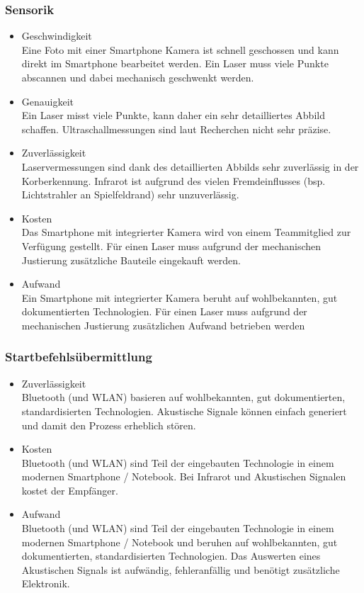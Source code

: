 		\subsubsection{Sensorik}
			\begin{itemize}
				\item Geschwindigkeit\\
				Eine Foto mit einer Smartphone Kamera ist schnell geschossen und kann direkt im Smartphone bearbeitet werden. Ein Laser muss viele Punkte abscannen und dabei mechanisch geschwenkt werden.
				\item Genauigkeit\\
				Ein Laser misst viele Punkte, kann daher ein sehr detailliertes Abbild schaffen. Ultraschallmessungen sind laut Recherchen nicht sehr präzise.  
				\item Zuverlässigkeit\\
				Laservermessungen sind dank des detaillierten Abbilds sehr zuverlässig in der Korberkennung. Infrarot ist aufgrund des vielen Fremdeinflusses (bsp. Lichtstrahler an Spielfeldrand) sehr unzuverlässig.
				\item Kosten\\
				Das Smartphone mit integrierter Kamera wird von einem Teammitglied zur Verfügung gestellt. Für einen Laser muss aufgrund der mechanischen Justierung zusätzliche Bauteile eingekauft werden.
				\item Aufwand\\
				Ein Smartphone mit integrierter Kamera beruht auf wohlbekannten, gut dokumentierten Technologien. Für einen Laser muss aufgrund der mechanischen Justierung zusätzlichen Aufwand betrieben werden
			\end{itemize}
			
		\subsubsection{Startbefehlsübermittlung}
			\begin{itemize}
				\item Zuverlässigkeit\\
				Bluetooth (und WLAN) basieren auf wohlbekannten, gut dokumentierten, standardisierten Technologien. Akustische Signale können einfach generiert und damit den Prozess erheblich stören.
				\item Kosten\\
				Bluetooth (und WLAN) sind Teil der eingebauten Technologie in einem modernen Smartphone / Notebook. Bei Infrarot und Akustischen Signalen kostet der Empfänger.
				\item Aufwand\\
				Bluetooth (und WLAN) sind Teil der eingebauten Technologie in einem modernen Smartphone / Notebook und beruhen auf wohlbekannten, gut dokumentierten, standardisierten Technologien. Das Auswerten eines Akustischen Signals ist aufwändig, fehleranfällig und benötigt zusätzliche Elektronik.
			\end{itemize}
			
